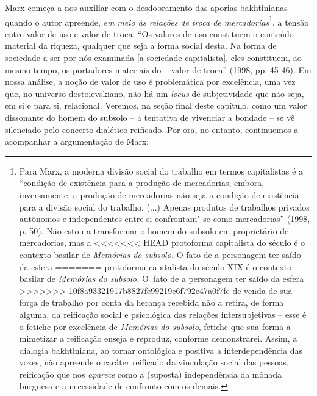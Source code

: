 {Marx começa a nos auxiliar com o desdobramento das aporias bakhtinianas
quando o autor apreende, \emph{em meio às relações de troca de
mercadorias}\footnote{Para Marx, a moderna divisão social do trabalho em
  termos capitalistas é a ``condição de existência para a produção de
  mercadorias, embora, inversamente, a produção de mercadorias não seja
  a condição de existência para a divisão social do trabalho. (...)
  Apenas produtos de trabalhos privados autônomos e independentes entre
  si confrontam"-se como mercadorias'' (1998, p. 50). Não estou a
  transformar o homem do subsolo em proprietário de mercadorias, mas a
<<<<<<< HEAD
  protoforma capitalista do século  é o contexto basilar de
  \emph{Memórias do subsolo.} O fato de a personagem ter saído da esfera
=======
  protoforma capitalista do século XIX é o contexto basilar de
  \emph{Memórias do subsolo.} O~fato de a personagem ter saído da esfera
>>>>>>> 10f8a93321917b8827fe99219c6f792e47a0f7fe
  de venda de sua força de trabalho por conta da herança recebida não a
  retira, de forma alguma, da reificação social e psicológica das
  relações intersubjetivas -- esse é o fetiche por excelência de
  \emph{Memórias do subsolo}, fetiche que sua forma a mimetizar a
  reificação enseja e reproduz, conforme demonstrarei. Assim, a dialogia
  bakhtiniana, ao tornar ontológica e positiva a interdependência das
  vozes, não apreende o caráter reificado da vinculação social das
  pessoas, reificação que nos \emph{aparece} como a (suposta)
  independência da mônada burguesa e a necessidade de confronto com os
  demais.}, a tensão entre valor de uso e valor de troca. ``Os valores
de uso constituem o conteúdo material da riqueza, qualquer que seja a
forma social desta. Na forma de sociedade a ser por nós examinada {[}a
sociedade capitalista{]}, eles constituem, ao mesmo tempo, os portadores
materiais do -- valor de troca'' (1998, pp. 45-46). Em nossa análise, a
noção de valor de uso é problemática por excelência, uma vez que, no
universo dostoievskiano, não há um \emph{locus} de subjetividade que não
seja, em si e para si, relacional. Veremos, na seção final deste
capítulo, como um valor dissonante do homem do subsolo -- a tentativa de
vivenciar a bondade -- se vê silenciado pelo concerto dialético
reificado. Por ora, no entanto, continuemos a acompanhar a argumentação
de Marx:

}
